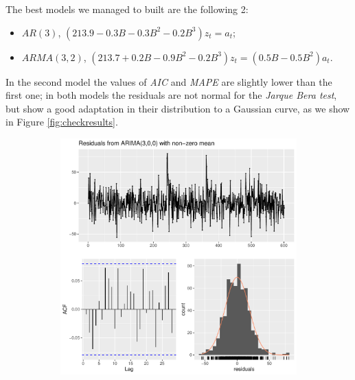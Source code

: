 \documentclass[11pt,a4paper,final]{paper}
\begin{document}
The best models we managed to built are the following 2:
\begin{itemize}
	\item $AR(3)$, $(213.9-0.3B-0.3B^2-0.2B^3 ) z_t=a_t$;
	\item $ARMA(3,2)$, $(213.7+0.2B-0.9B^2-0.2B^3 ) z_t=(0.5B-0.5B^2)a_t$.
\end{itemize}
In the second model the values of \textit{AIC} and \textit{MAPE }are slightly lower than the first one; in both models the residuals are not normal for the \textit{Jarque Bera test}, but show a good adaptation in their distribution to a Gaussian curve, as we show in Figure \ref{fig:checkresults}. 

\begin{figure}[h]
	\begin{subfigure}[b]{0.49\textwidth}
		\includegraphics[width=\textwidth]{../images/check_residuals_prime.pdf}
	\end{subfigure}
	\begin{subfigure}[b]{0.49\textwidth}

\end{subfigure}
\end{figure}
\end{document}
